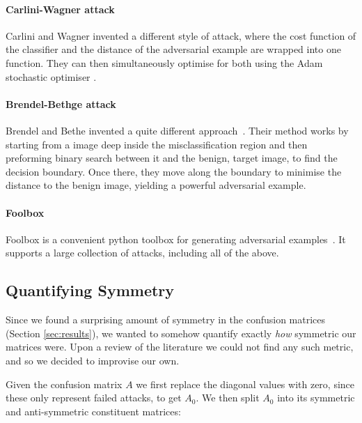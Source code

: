 \documentclass{article}
\begin{document}

\paragraph{Carlini-Wagner attack}

Carlini and Wagner \cite{carlini2017towards} invented a different style of attack, where the cost function of the classifier and the distance of the adversarial example are wrapped into one function. They can then simultaneously optimise for both using the Adam stochastic optimiser \cite{kingma2017adam}.

\paragraph{Brendel-Bethge attack}

Brendel and Bethe invented a quite different approach~\cite{brendel2019accurate}.
Their method works by starting from a image deep inside the misclassification region and then preforming binary search between it and the benign, target image, to find the decision boundary. Once there, they move along the boundary to minimise the distance to the benign image, yielding a powerful adversarial example.

\paragraph{Foolbox}
Foolbox is a convenient python toolbox for generating adversarial examples~\cite{rauber2017foolbox}. It supports a large collection of attacks, including all of the above.

\subsection{Quantifying Symmetry}

Since we found a surprising amount of symmetry in the confusion matrices (Section \ref{sec:results}), we wanted to somehow quantify exactly \textit{how} symmetric our matrices were. Upon a review of the literature we could not find any such metric, and so we decided to improvise our own.

Given the confusion matrix $A$ we first replace the diagonal values with zero, since these only represent failed attacks, to get $A_0$. We then split $A_0$ into its symmetric and anti-symmetric constituent matrices:
\end{document}
